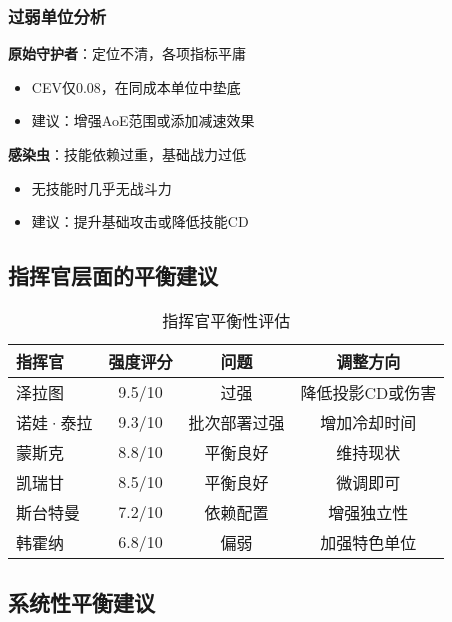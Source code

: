 \documentclass[a4paper,12pt]{article}
\begin{document}
\subsubsection{过弱单位分析}
\textbf{原始守护者}：定位不清，各项指标平庸
\begin{itemize}
\item CEV仅0.08，在同成本单位中垫底
\item 建议：增强AoE范围或添加减速效果
\end{itemize}

\textbf{感染虫}：技能依赖过重，基础战力过低
\begin{itemize}
\item 无技能时几乎无战斗力
\item 建议：提升基础攻击或降低技能CD
\end{itemize}

\subsection{指挥官层面的平衡建议}

\begin{table}[h]
\centering
\caption{指挥官平衡性评估}
\begin{tabular}{lccc}
\toprule
\textbf{指挥官} & \textbf{强度评分} & \textbf{问题} & \textbf{调整方向} \\
\midrule
泽拉图 & 9.5/10 & 过强 & 降低投影CD或伤害 \\
诺娃·泰拉 & 9.3/10 & 批次部署过强 & 增加冷却时间 \\
蒙斯克 & 8.8/10 & 平衡良好 & 维持现状 \\
凯瑞甘 & 8.5/10 & 平衡良好 & 微调即可 \\
斯台特曼 & 7.2/10 & 依赖配置 & 增强独立性 \\
韩霍纳 & 6.8/10 & 偏弱 & 加强特色单位 \\
\bottomrule
\end{tabular}
\end{table}

\subsection{系统性平衡建议}
\end{document}
